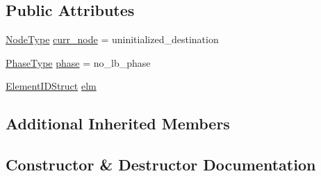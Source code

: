 \subsection*{Public Attributes}
\begin{DoxyCompactItemize}
\item 
\hyperlink{namespacevt_a866da9d0efc19c0a1ce79e9e492f47e2}{Node\+Type} \hyperlink{structvt_1_1vrt_1_1collection_1_1balance_1_1_l_b_data_restart_reader_1_1_update_msg_aa3393d7888ea637ced5b80a854090ce3}{curr\+\_\+node} = uninitialized\+\_\+destination
\item 
\hyperlink{namespacevt_a46ce6733d5cdbd735d561b7b4029f6d7}{Phase\+Type} \hyperlink{structvt_1_1vrt_1_1collection_1_1balance_1_1_l_b_data_restart_reader_1_1_update_msg_af85fa6a0407e7a02715a34448ee50a3f}{phase} = no\+\_\+lb\+\_\+phase
\item 
\hyperlink{namespacevt_1_1vrt_1_1collection_1_1balance_a9f5b53fafb270212279a4757d2c4cd28}{Element\+I\+D\+Struct} \hyperlink{structvt_1_1vrt_1_1collection_1_1balance_1_1_l_b_data_restart_reader_1_1_update_msg_a51c68d7e69df000c9020cdc94865bafb}{elm}
\end{DoxyCompactItemize}
\subsection*{Additional Inherited Members}


\subsection{Constructor \& Destructor Documentation}
\mbox{\label{structvt_1_1vrt_1_1collection_1_1balance_1_1_l_b_data_restart_reader_1_1_update_msg_a464255a6854dd3ed4053bffc35182ea0}} 
